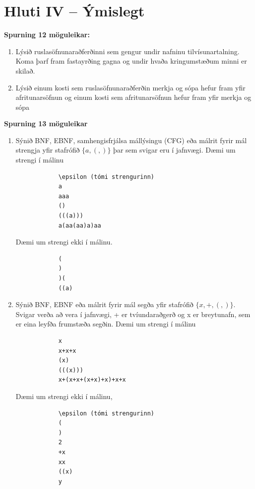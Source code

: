 \documentclass{article}
\newcommand{\bo}[1]{\textbf{#1}}
\begin{document}
    \newpage
    \section{Hluti IV – Ýmislegt}

    \bo{Spurning 12 möguleikar:}
    \begin{enumerate}
        \item Lýsið ruslasöfnunaraðferðinni sem gengur undir nafninu
        tilvísunartalning. Koma þarf fram fastayrðing gagna og undir hvaða
        kringumstæðum minni er skilað.

        \item Lýsið einum kosti sem ruslasöfnunaraðferðin merkja og sópa hefur
        fram yfir afritunarsöfnun og einum kosti sem afritunarsöfnun hefur
        fram yfir merkja og sópa
    \end{enumerate}

    \bo{Spurning 13 möguleikar}
    \begin{enumerate}
        \item Sýnið BNF, EBNF, samhengisfrjálsa mállýsingu (CFG) eða málrit
        fyrir mál strengja yfir stafrófið $\{a, (, )\}$ þar sem svigar eru í jafnvægi.
        Dæmi um strengi í málinu
        \begin{verbatim}
            \epsilon (tómi strengurinn)
            a
            aaa 
            ()
            (((a)))
            a(aa(aa)a)aa
        \end{verbatim}
        Dæmi um strengi ekki í málinu.
        \begin{verbatim}
            (
            )
            )(
            ((a)
        \end{verbatim}
        \item Sýnið BNF, EBNF eða málrit fyrir mál segða yfir stafrófið $\{x, +, (, )\}$.
        Svigar verða að vera í jafnvægi, + er tvíundaraðgerð og x er
        breytunafn, sem er eina leyfða frumstæða segðin.
        Dæmi um strengi í málinu
        \begin{verbatim}
            x
            x+x+x
            (x)
            (((x)))
            x+(x+x+(x+x)+x)+x+x
        \end{verbatim}
        Dæmi um strengi ekki í málinu,
        \begin{verbatim}
            \epsilon (tómi strengurinn)
            (
            )
            2
            +x
            xx
            ((x)
            y
        \end{verbatim}

    \end{enumerate}
\end{document}
